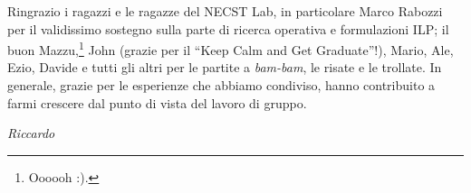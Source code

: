 Ringrazio i ragazzi e le ragazze del NECST Lab, in particolare Marco Rabozzi
per il validissimo sostegno sulla parte di ricerca operativa e formulazioni
\acs{ILP}; il buon Mazzu,\footnote{Oooooh :).} John (grazie per
il ``Keep Calm and Get Graduate''!), Mario, Ale, Ezio, Davide e tutti gli altri per le partite
a \emph{bam-bam}, le risate e le trollate. In generale, grazie per le esperienze
che abbiamo condiviso, hanno contribuito a farmi crescere dal punto di vista del
lavoro di gruppo.

\vspace{1.5em}
\begin{flushright}
 \textit{Riccardo}
\end{flushright}
